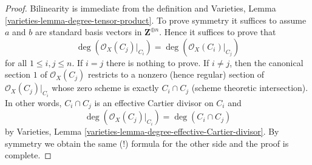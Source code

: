 \documentclass[10pt,a4paper]{amsart}
\theoremstyle{plain}
\theoremstyle{definition}
\theoremstyle{remark}
\numberwithin{equation}{subsection}
\begin{document}
\begin{proof}
Bilinearity is immediate from the definition and
Varieties, Lemma \ref{varieties-lemma-degree-tensor-product}.
To prove symmetry it suffices to assume $a$ and $b$ are
standard basis vectors in $\mathbf{Z}^{\oplus n}$.
Hence it suffices to prove that
$$
\deg(\mathcal{O}_X(C_j)|_{C_i}) = \deg(\mathcal{O}_X(C_i)|_{C_j})
$$
for all $1 \leq i, j \leq n$. If $i = j$ there is nothing to prove.
If $i \not = j$, then the canonical section $1$ of $\mathcal{O}_X(C_j)$
restricts to a nonzero (hence regular) section of $\mathcal{O}_X(C_j)|_{C_i}$
whose zero scheme is exactly $C_i \cap C_j$ (scheme theoretic intersection).
In other words, $C_i \cap C_j$ is an effective Cartier divisor on $C_i$
and
$$
\deg(\mathcal{O}_X(C_j)|_{C_i}) = \deg(C_i \cap C_j)
$$
by Varieties, Lemma \ref{varieties-lemma-degree-effective-Cartier-divisor}.
By symmetry we obtain the same (!) formula for the other side
and the proof is complete.
\end{proof}
\end{document}

